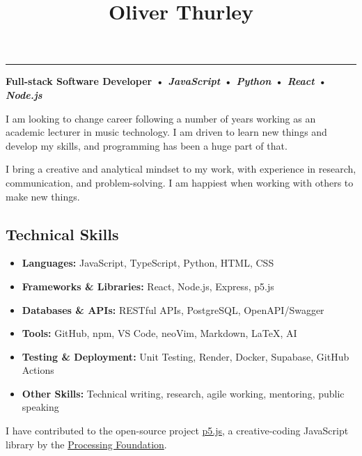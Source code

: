 \documentclass[10pt,a4paper]{article}
\title{{\huge Oliver Thurley}{\raggedright}}
\author{}
\date{}
\makeatletter
\renewcommand{\maketitle}{\bgroup\setlength{\parindent}{0pt}
\begin{flushleft}
  \normalfont{\@title}
  \@author
\end{flushleft}\egroup
}
\makeatother
\begin{document}
\maketitle

\vspace{0.5em}
\noindent\href{mailto:o.thrly@gmail.com}{} \hfill
{} \hfill
\href{https://thrly.com}{} \hfill
\href{https://github.com/thrly}{} \hfill
\href{https://linkedin.com/in/oliver-thurley}{}

\vspace{0.75em}
\noindent\rule{\textwidth}{0.5pt}

\textbf{Full-stack Software Developer • \emph{JavaScript} •
\emph{Python} • \emph{React} • \emph{Node.js}}

I am looking to change career following a number of years working as an
academic lecturer in music technology. I am driven to learn new things
and develop my skills, and programming has been a huge part of that.

I bring a creative and analytical mindset to my work, with experience in
research, communication, and problem-solving. I am happiest when working
with others to make new things.

\subsection{Technical Skills}\label{technical-skills}

\begin{itemize}
\item
  \textbf{Languages:} JavaScript, TypeScript, Python, HTML, CSS
\item
  \textbf{Frameworks \& Libraries:} React, Node.js, Express, p5.js
\item
  \textbf{Databases \& APIs:} RESTful APIs, PostgreSQL, OpenAPI/Swagger
\item
  \textbf{Tools:} GitHub, npm, VS Code, neoVim, Markdown, LaTeX, AI
\item
  \textbf{Testing \& Deployment:} Unit Testing, Render, Docker,
  Supabase, GitHub Actions
\item
  \textbf{Other Skills:} Technical writing, research, agile working,
  mentoring, public speaking
\end{itemize}

I have contributed to the open-source project
\href{https://p5js.org/}{p5.js}, a creative-coding JavaScript library by
the \href{https://processingfoundation.org/}{Processing Foundation}.
\end{document}
